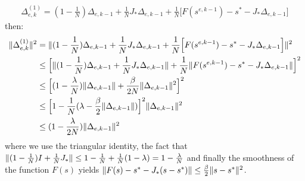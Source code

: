 \begin{equation}
\begin{split}
\Delta_{e,k}^{(1)} = (1-\frac{1}{N})\Delta_{e,k-1} + \frac{1}{N}J_* \Delta_{e,k-1} +  \frac{1}{N} \Big[ F(s^{e,k-1}) - s^* -J_* \Delta_{e,k-1}\Big]
\end{split}
\end{equation}
then:
\begin{equation}
\begin{split}
\lVert\Delta_{e,k}^{(1)}\rVert^2 & = \lVert(1-\frac{1}{N})\Delta_{e,k-1} + \frac{1}{N} J_* \Delta_{e,k-1} +  \frac{1}{N} \Big[ F(s^{e,k-1}) - s^* -J_* \Delta_{e,k-1}\Big]\rVert^2 \\
& \leq \Big[ \lVert(1-\frac{1}{N}) \Delta_{e,k-1} + \frac{1}{N}J_* \Delta_{e,k-1} \rVert + \frac{1}{N} \lVert F(s^{e,k-1}) - s^* -J_* \Delta_{e,k-1}\rVert\Big]^2 \\
& \leq \Big[ (1-\frac{\lambda}{N})\lVert\Delta_{e,k-1}\rVert + \frac{\beta}{2N} \lVert\Delta_{e,k-1}\rVert^2 \Big]^2\\
& \leq \Big[ 1 - \frac{1}{N}(\lambda - \frac{\beta}{2} \lVert\Delta_{e,k-1}\rVert) \Big]^2 \lVert\Delta_{e,k-1}\rVert^2\\
& \leq (1 - \frac{\lambda}{2N})\lVert\Delta_{e,k-1}\rVert^2
\end{split}
\end{equation}
where we use the triangular identity, the fact that $\lVert(1 - \frac{1}{N})I + \frac{1}{N} J_*\rVert \leq 1 - \frac{1}{N} + \frac{1}{N}(1-\lambda) = 1 - \frac{\lambda}{N}$ and finally the smoothness of the function $F(s)$ yields $\lVert F(s) - s^* - J_* (s - s^*)\rVert \leq \frac{\beta}{2}\lVert s - s^*\rVert^2$.

